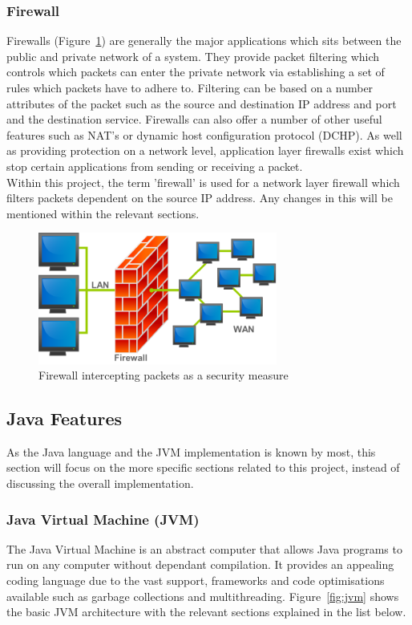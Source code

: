 \documentclass[interim_report.tex]{subfiles}
\begin{document}
\subsubsection{Firewall}
Firewalls (Figure~\ref{fig:firewall}) are generally the major applications which sits between the public and private network of a system. They provide packet filtering which controls which packets can enter the private network via establishing a set of rules which packets have to adhere to. Filtering can be based on a number attributes of the packet such as the source and destination IP address and port and the destination service. Firewalls can also offer a number of other useful features such as NAT's or dynamic host configuration protocol (DCHP). As well as providing protection on a network level, application layer firewalls exist which stop certain applications from sending or receiving a packet. \\
\newline
Within this project, the term 'firewall' is used for a network layer firewall which filters packets dependent on the source IP address. Any changes in this will be mentioned within the relevant sections. \\

\begin{figure}[H]
	\centering
	\includegraphics[width=0.7\textwidth]{img/firewall.png}
	\caption{Firewall intercepting packets as a security measure \cite{firewall}}
	\label{fig:firewall}
\end{figure}

\subsection{Java Features}
As the Java language and the JVM implementation is known by most, this section will focus on the more specific sections related to this project, instead of discussing the overall implementation.

\subsubsection{Java Virtual Machine (JVM)}
The Java Virtual Machine is an abstract computer that allows Java programs to run on any computer without dependant compilation. It provides an appealing coding language due to the vast support, frameworks and code optimisations available such as garbage collections and multithreading. Figure~\ref{fig:jvm} shows the basic JVM architecture with the relevant sections explained in the list below.
\end{document}
